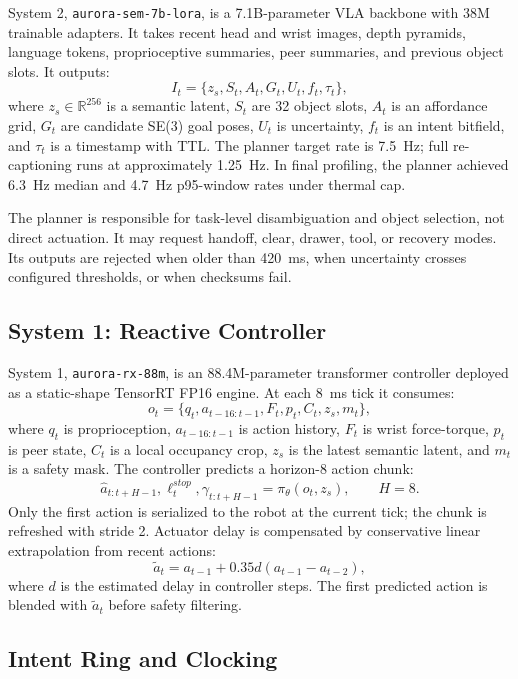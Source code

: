 \documentclass[10pt,twocolumn]{article}
\begin{document}
System 2, \texttt{aurora-sem-7b-lora}, is a 7.1B-parameter VLA backbone with 38M trainable adapters. It takes recent head and wrist images, depth pyramids, language tokens, proprioceptive summaries, peer summaries, and previous object slots. It outputs:
\[
I_t = \{z_s, S_t, A_t, G_t, U_t, f_t, \tau_t\},
\]
where $z_s \in \mathbb{R}^{256}$ is a semantic latent, $S_t$ are 32 object slots, $A_t$ is an affordance grid, $G_t$ are candidate SE(3) goal poses, $U_t$ is uncertainty, $f_t$ is an intent bitfield, and $\tau_t$ is a timestamp with TTL. The planner target rate is \SI{7.5}{Hz}; full re-captioning runs at approximately \SI{1.25}{Hz}. In final profiling, the planner achieved \SI{6.3}{Hz} median and \SI{4.7}{Hz} p95-window rates under thermal cap.

The planner is responsible for task-level disambiguation and object selection, not direct actuation. It may request handoff, clear, drawer, tool, or recovery modes. Its outputs are rejected when older than \SI{420}{ms}, when uncertainty crosses configured thresholds, or when checksums fail.

\subsection{System 1: Reactive Controller}

System 1, \texttt{aurora-rx-88m}, is an 88.4M-parameter transformer controller deployed as a static-shape TensorRT FP16 engine. At each \SI{8}{ms} tick it consumes:
\[
o_t = \{q_t, a_{t-16:t-1}, F_t, p_t, C_t, z_s, m_t\},
\]
where $q_t$ is proprioception, $a_{t-16:t-1}$ is action history, $F_t$ is wrist force-torque, $p_t$ is peer state, $C_t$ is a local occupancy crop, $z_s$ is the latest semantic latent, and $m_t$ is a safety mask. The controller predicts a horizon-8 action chunk:
\[
\hat{a}_{t:t+H-1}, \ell^{stop}_t, \gamma_{t:t+H-1}
= \pi_\theta(o_t, z_s), \qquad H=8.
\]
Only the first action is serialized to the robot at the current tick; the chunk is refreshed with stride 2. Actuator delay is compensated by conservative linear extrapolation from recent actions:
\[
\tilde{a}_t = a_{t-1} + 0.35 d (a_{t-1} - a_{t-2}),
\]
where $d$ is the estimated delay in controller steps. The first predicted action is blended with $\tilde{a}_t$ before safety filtering.

\subsection{Intent Ring and Clocking}
\end{document}

